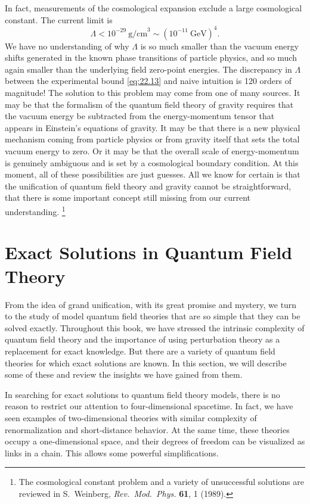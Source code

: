 In fact, measurements of the cosmological expansion exclude a large
cosmological constant.  The current limit is
\begin{equation}
  \Lambda < 10^{-29}\ \mathrm{g/cm}^3 \sim (10^{-11}\ \mathrm{GeV})^4 .
  \label{eq:22.13}
\end{equation}
We have no understanding of why $\Lambda$ is so much smaller than the vacuum
energy shifts generated in the known phase transitions of particle physics,
and so much again smaller than the underlying field zero-point energies.  The
discrepancy in $\Lambda$ between the experimental bound \eqref{eq:22.13} and
naive intuition is 120 orders of magnitude!  The solution to this problem may
come from one of many sources.  It may be that the formalism of the quantum
field theory of gravity requires that the vacuum energy be subtracted from
the energy-momentum tensor that appears in Einstein's equations of gravity.
It may be that there is a new physical mechanism coming from particle physics
or from gravity itself that sets the total vacuum energy to zero.  Or it may
be that the overall scale of energy-momentum is genuinely ambiguous and is
set by a cosmological boundary condition.  At this moment, all of these
possibilities are just guesses.  All we know for certain is that the
unification of quantum field theory and gravity cannot be straightforward,
that there is some important concept still missing from our current
understanding.%
\footnote{The cosmological constant problem and a variety of unsuccessful
solutions are reviewed in S.~Weinberg, \emph{Rev.\ Mod.\ Phys.} \textbf{61},
1 (1989).}

\section{Exact Solutions in Quantum Field Theory}

From the idea of grand unification, with its great promise and mystery, we
turn to the study of model quantum field theories that are so simple that
they can be solved exactly.  Throughout this book, we have stressed the
intrinsic complexity of quantum field theory and the importance of using
perturbation theory as a replacement for exact knowledge.  But there are a
variety of quantum field theories for which exact solutions are known.  In
this section, we will describe some of these and review the insights we have
gained from them.

In searching for exact solutions to quantum field theory models, there is no
reason to restrict our attention to four-dimensional spacetime.  In fact, we
have seen examples of two-dimensional theories with similar complexity of
renormalization and short-distance behavior.  At the same time, these
theories occupy a one-dimensional space, and their degrees of freedom can be
visualized as links in a chain.  This allows some powerful simplifications.

